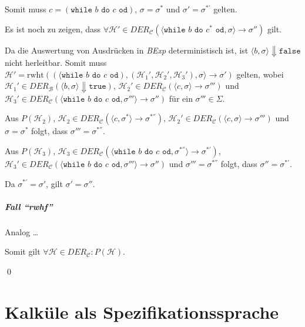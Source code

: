 					Somit muss $ c = (\texttt{while } b \texttt{ do } c \texttt{ od}) $, $ \sigma = \sigma ^ * $ und $ \sigma' = \sigma ^ {*'} $ gelten.

					Es ist noch zu zeigen, dass $ \forall \mathcal{H}' \in \textit{DER} _ \mathcal{C} (\langle \texttt{while } b \texttt{ do } c ^ * \texttt{ od}, \sigma \rangle \rightarrow \sigma'') $ gilt.

					Da die Auswertung von Ausdrücken in \textit{BExp} deterministisch ist, ist $ \langle b, \sigma \rangle \Downarrow \texttt{false} $ nicht herleitbar. Somit muss $ \mathcal{H}' = \text{rwht}((\langle \texttt{while } b \texttt{ do } c \texttt{ od}), (\mathcal{H} _ 1 ', \mathcal{H} _ 2 ', \mathcal{H} _ 3 '), \sigma \rangle \rightarrow \sigma') $ gelten, wobei $ \mathcal{H} _ 1 ' \in \textit{DER} _ \mathcal{B} (\langle b, \sigma \rangle \Downarrow \texttt{true}) $, $ \mathcal{H} _ 2 ' \in \textit{DER} _ \mathcal{C} (\langle c, \sigma \rangle \rightarrow \sigma''') $ und $ \mathcal{H} _ 3 ' \in \textit{DER} _ \mathcal{C} (\langle \texttt{while } b \texttt{ do } c \texttt{ od}, \sigma''' \rangle \rightarrow \sigma'') $ für ein $ \sigma''' \in \Sigma $.

					Aus $ P(\mathcal{H} _ 2) $, $ \mathcal{H} _ 2 \in \textit{DER} _ \mathcal{C} (\langle c, \sigma ^ * \rangle \rightarrow \sigma ^ {*''}) $, $ \mathcal{H} _ 2 ' \in \textit{DER} _ \mathcal{C} (\langle c, \sigma \rangle \rightarrow \sigma''') $ und $ \sigma = \sigma ^ * $ folgt, dass $ \sigma''' = \sigma ^ {*''} $.

					Aus $ P(\mathcal{H} _ 3) $, $ \mathcal{H} _ 3 \in \textit{DER} _ \mathcal{C} (\langle \texttt{while } b \texttt{ do } c \texttt{ od}, \sigma ^ {*''} \rangle \rightarrow \sigma ^ {*'}) $, $ \mathcal{H} _ 3 ' \in \textit{DER} _ \mathcal{C} (\langle \texttt{while } b \texttt{ do } c \texttt{ od}, \sigma''' \rangle \rightarrow \sigma'') $ und $ \sigma''' = \sigma ^ {*''} $ folgt, dass $ \sigma'' = \sigma ^ {*'} $.

					Da $ \sigma ^ {*'} = \sigma' $, gilt $ \sigma' = \sigma'' $.

				\subparagraph{Fall \enquote{rwhf}}
					Analog \dots

					Somit gilt $ \forall \mathcal{H} \in \textit{DER} _ \mathcal{C} : P(\mathcal{H}) $.

					\qed

	\section{Kalküle als Spezifikationssprache}
